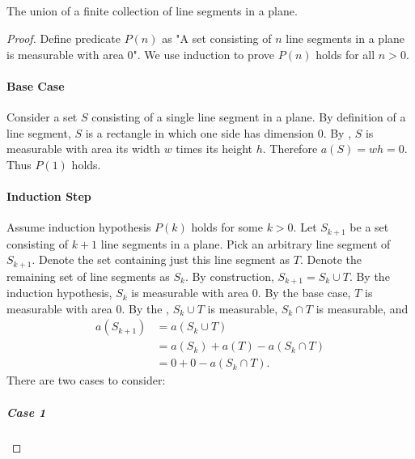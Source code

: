 \documentclass{report}
\begin{document}
\subsection{}%
\label{sub:exercise-1.7.1c}

The union of a finite collection of line segments in a plane.

\begin{proof}

  Define predicate $P(n)$ as "A set consisting of $n$ line segments in a plane
    is measurable with area $0$".
  We use induction to prove $P(n)$ holds for all $n > 0$.

  \paragraph{Base Case}%

    Consider a set $S$ consisting of a single line segment in a plane.
    By definition of a line segment, $S$ is a rectangle in which one side has
      dimension $0$.
    By , $S$ is measurable with area its width
      $w$ times its height $h$.
    Therefore $a(S) = wh = 0$.
    Thus $P(1)$ holds.

  \paragraph{Induction Step}%

    Assume induction hypothesis $P(k)$ holds for some $k > 0$.
    Let $S_{k+1}$ be a set consisting of $k + 1$ line segments in a plane.
    Pick an arbitrary line segment of $S_{k+1}$.
    Denote the set containing just this line segment as $T$.
    Denote the remaining set of line segments as $S_k$.
    By construction, $S_{k+1} = S_k \cup T$.
    By the induction hypothesis, $S_k$ is measurable with area $0$.
    By the base case, $T$ is measurable with area $0$.
    By the , $S_k \cup T$ is measurable,
      $S_k \cap T$ is measurable, and
      \begin{align}
        a(S_{k+1})
          & = a(S_k \cup T) \nonumber \\
          & = a(S_k) + a(T) - a(S_k \cap T) \nonumber \\
          & = 0 + 0 - a(S_k \cap T). \label{sub:exercise-1.7.1c-eq1}
      \end{align}
    There are two cases to consider:

    \subparagraph{Case 1}%


\end{proof}
\end{document}
